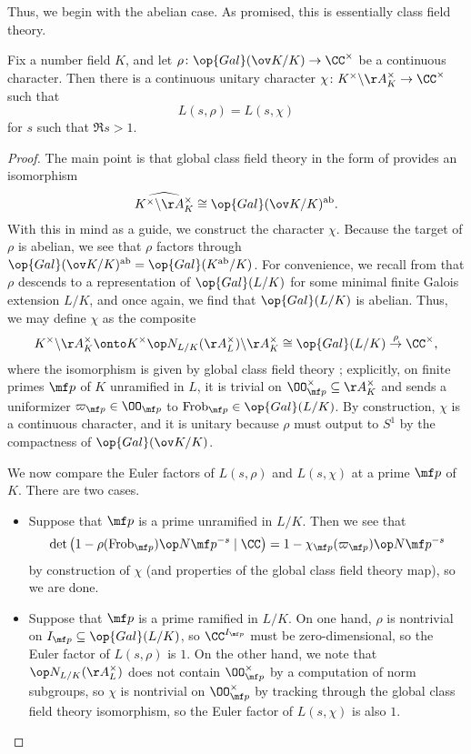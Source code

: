 \documentclass[../thesis.tex]{subfiles}
\begin{document}
Thus, we begin with the abelian case. As promised, this is essentially class field theory.
\begin{proposition} \label{prop:langlands-gl-1}
	Fix a number field $K$, and let $\rho\colon\op{Gal}(\ov K/K)\to\CC^\times$ be a continuous character. Then there is a continuous unitary character $\chi\colon K^\times\backslash\AA_K^\times\to\CC^\times$ such that
	\[L(s,\rho)=L(s,\chi)\]
	for $s$ such that $\Re s>1$.
\end{proposition}
\begin{proof}
	The main point is that global class field theory in the form of \cite[Theorem~5.3]{milne-cft} provides an isomorphism
	\[\widehat{K^\times\backslash\AA_K^\times}\cong\op{Gal}(\ov K/K)^{\mathrm{ab}}.\]
	With this in mind as a guide, we construct the character $\chi$. Because the target of $\rho$ is abelian, we see that $\rho$ factors through $\op{Gal}(\ov K/K)^{\mathrm{ab}}=\op{Gal}(K^{\mathrm{ab}}/K)$. For convenience, we recall from  that $\rho$ descends to a representation of $\op{Gal}(L/K)$ for some minimal finite Galois extension $L/K$, and once again, we find that $\op{Gal}(L/K)$ is abelian. Thus, we may define $\chi$ as the composite
	\[K^\times\backslash\AA_K^\times\onto K^\times\op N_{L/K}(\AA_L^\times)\backslash\AA_K^\times\cong\op{Gal}(L/K)\stackrel\rho\to\CC^\times,\]
	where the isomorphism is given by global class field theory \cite[Theorem~5.3]{milne-cft}; explicitly, on finite primes $\mf p$ of $K$ unramified in $L$, it is trivial on $\OO_{\mf p}^\times\subseteq\AA_K^\times$ and sends a uniformizer $\varpi_{\mf p}\in\OO_{\mf p}$ to $\mathrm{Frob}_{\mf p}\in\op{Gal}(L/K)$. By construction, $\chi$ is a continuous character, and it is unitary because $\rho$ must output to $S^1$ by the compactness of $\op{Gal}(\ov K/K)$.

	We now compare the Euler factors of $L(s,\rho)$ and $L(s,\chi)$ at a prime $\mf p$ of $K$. There are two cases.
	\begin{itemize}
		\item Suppose that $\mf p$ is a prime unramified in $L/K$. Then we see that
		\[\det\left(1-\rho(\mathrm{Frob}_{\mf p})\op N\mf p^{-s}\mid\CC\right)=1-\chi_{\mf p}(\varpi_{\mf p})\op N\mf p^{-s}\]
		by construction of $\chi$ (and properties of the global class field theory map), so we are done.
		\item Suppose that $\mf p$ is a prime ramified in $L/K$. On one hand, $\rho$ is nontrivial on $I_{\mf p}\subseteq\op{Gal}(L/K)$, so $\CC^{I_{\mf p}}$ must be zero-dimensional, so the Euler factor of $L(s,\rho)$ is $1$. On the other hand, we note that $\op N_{L/K}(\AA_L^\times)$ does not contain $\OO_{\mf p}^\times$ by a computation of norm subgroups, so $\chi$ is nontrivial on $\OO_{\mf p}^\times$ by tracking through the global class field theory isomorphism, so the Euler factor of $L(s,\chi)$ is also $1$.
		\qedhere
	\end{itemize}
\end{proof}
\end{document}
